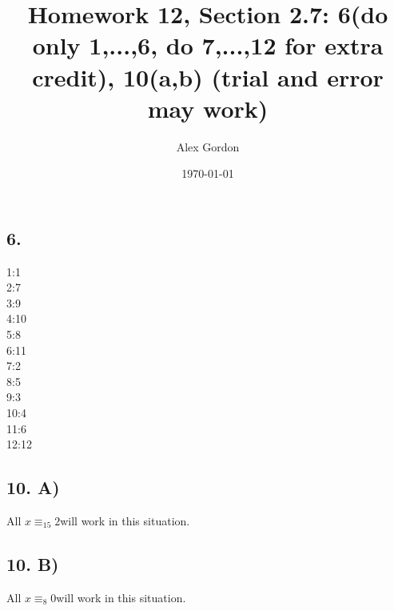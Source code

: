 \documentclass[12]{scrartcl}
\begin{document}
\title{Homework 12, Section 2.7: 6(do only 1,...,6, do 7,...,12 for extra credit), 10(a,b) (trial and error may work) }
\author{Alex Gordon}
\date{\today}
\maketitle
\subsection*{6.}
1:1\\
2:7\\
3:9\\
4:10\\
5:8\\
6:11\\
7:2\\
8:5\\
9:3\\
10:4\\
11:6\\
12:12

\subsection*{10. A)}
All $x \equiv_{15} 2 $will work in this situation.

\subsection*{10. B)}
All $x \equiv_{8} 0 $will work in this situation.
\end{document}
